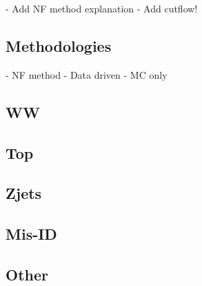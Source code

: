 

- Add NF method explanation
- Add cutflow!
\subsection{Methodologies}
- NF method
- Data driven
- MC only

\subsection{WW}
\subsection{Top}
\subsection{Zjets}
\subsection{Mis-ID}
\subsection{Other}
